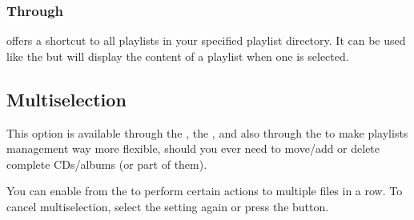 \subsubsection{Through }
 offers a shortcut to all playlists in your
\daps{} specified playlist directory.
It can be used like the  but will display
the content of a playlist when one is selected.

\subsection{Multiselection}
This option is available through the , the ,
and also through the  to make playlists management way more flexible,
should you ever need to move/add or delete complete CDs/albums (or part of them).

You can enable  from the  to perform certain
actions to multiple files in a row.
To cancel multiselection, select the setting again or press the \ActionWpsSkipPrev{} button.


